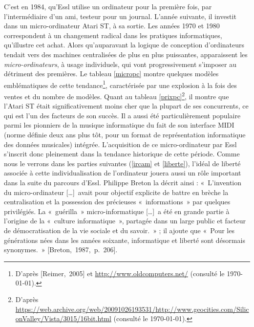 \documentclass[a4paper,12pt]{article}
\newcommand{\guill}[1]{«~#1~»}
\newcommand{\tpp}[0]{[\dots]}
\newcommand{\cicite}[1]{{\footnotesize[#1]}}
\begin{document}
C'est en 1984, qu'Essl utilise un ordinateur pour la première fois, par l'intermédiaire d'un ami, testeur pour un journal. L'année suivante, il investit dans un micro-ordinateur Atari ST, à sa sortie. Les années 1970 et 1980 correspondent à un changement radical dans les pratiques informatiques, qu'illustre cet achat. Alors qu'auparavant la logique de conception d'ordinateurs tendait vers des machines centralisées de plus en plus puissantes, apparaissent les \emph{micro-ordinateurs}, à usage individuels, qui vont progressivement s'imposer au détriment des premières. Le tableau \ref{micropc} montre quelques modèles emblématiques de cette tendance\footnote{D'après \cicite{Reimer,~2005} et \href{http://www.oldcomputers.net/}{http://www.oldcomputers.net/} (consulté le \today).}, caractérisée par une explosion à la fois des ventes et du nombre de modèles. Quant au tableau \ref{prixpc}\footnote{D'après \\ \href{https://web.archive.org/web/20091026193531/http://www.geocities.com/SiliconValley/Vista/3015/16bit.html}{https://web.archive.org/web/20091026193531/http://www.geocities.com/SiliconValley/Vista/3015/16bit.html} (consulté le \today).}, il montre que l'Atari ST était significativement moins cher que la plupart de ses concurrents, ce qui est l'un des facteurs de son succès. Il a aussi été particulièrement populaire parmi les pionniers de la musique informatique du fait de son interface MIDI (norme définie deux ans plus tôt, pour un format de représentation informatique des données musicales) intégrée. L'acquisition de ce micro-ordinateur par Essl s'inscrit donc pleinement dans la tendance historique de cette période. Comme nous le verrons dans les parties suivantes (\ref{ircam} et \ref{liberte}), l'idéal de liberté associée à cette individualisation de l'ordinateur jouera aussi un rôle important dans la suite du parcours d'Essl. Philippe Breton la décrit ainsi : \guill{L'invention du micro-ordinateur \tpp~avait pour objectif explicite de battre en brèche la centralisation et la possession des précieuses \guill{informations} par quelques privilégiés. La \guill{guérilla} micro-informatique \tpp~a été en grande partie à l'origine de la \guill{culture informatique}, partagée dans un large public et facteur de démocratisation de la vie sociale et du savoir.} ; il ajoute que \guill{Pour les générations nées dans les années soixante, informatique et liberté sont désormais synonymes.} \cicite{Breton,~1987,~p.~206}.
\end{document}
